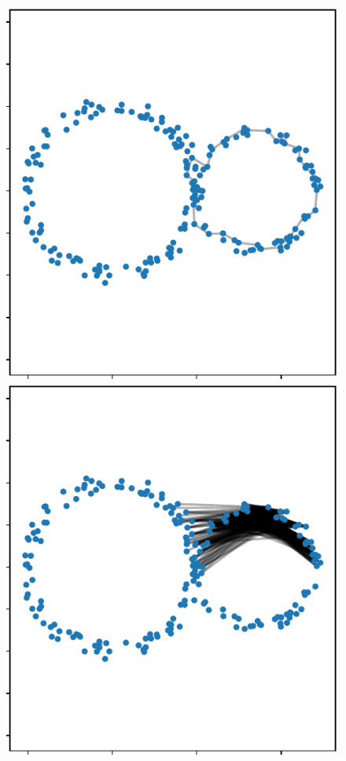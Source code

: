  \begin{figure}[htbp]
 \centering
     \includegraphics[scale=0.66]{figures/homology_cycle2.pdf}
     \includegraphics[scale=0.66]{figures/cohomology_cocycle2.pdf}

\end{figure}
